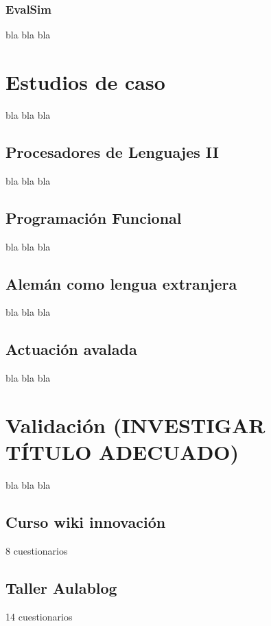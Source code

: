 		\subsubsection{EvalSim}

			bla bla bla

\section{Estudios de caso}

	bla bla bla

	\subsection{Procesadores de Lenguajes II}

		bla bla bla

	\subsection{Programación Funcional}

		bla bla bla

	\subsection{Alemán como lengua extranjera}

		bla bla bla

	\subsection{Actuación avalada}

		bla bla bla

\section{Validación (INVESTIGAR TÍTULO ADECUADO)}

	bla bla bla

	\subsection{Curso wiki innovación}

		8 cuestionarios

	\subsection{Taller Aulablog}

		14 cuestionarios


